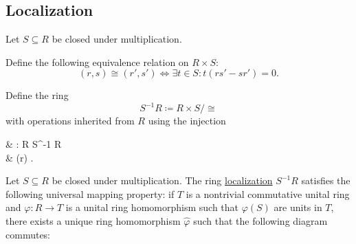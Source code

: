 \subsection{Localization}\label{subsec:localization}

\begin{definition}\label{def:ring_localization}
  Let \( S \subseteq R \) be closed under multiplication.

  Define the following equivalence relation on \( R \times S \):
  \begin{equation*}
    (r, s) \cong (r', s') \iff \exists t \in S: t(rs' - sr') = 0.
  \end{equation*}

  Define the ring
  \begin{equation*}
    S^{-1} R \coloneqq R \times S / \cong
  \end{equation*}
  with operations inherited from \( R \) using the injection
  \begin{balign*}
     & \iota: R \to S^{-1} R        \\
     & \iota(r) \coloneqq [(r, 1)].
  \end{balign*}
\end{definition}

\begin{proposition}\label{thm:ring_localization_universal_property}
  Let \( S \subseteq R \) be closed under multiplication. The ring \hyperref[def:ring_localization]{localization} \( S^{-1} R \) satisfies the following universal mapping property: if \( T \) is a nontrivial commutative unital ring and \( \varphi: R \to T \) is a unital ring homomorphism such that \( \varphi(S) \) are units in \( T \), there exists a unique ring homomorphism \( \hat \varphi \) such that the following diagram commutes:

  \begin{alignedeq}\label{thm:ring_localization_universal_property/diagram}
    \iffalse\begin{mplibcode}
      beginfig(1);
      input metapost/graphs;

      v1 := thelabel("$S^{-1} R$", origin);
      v2 := thelabel("$T$", (2, 0) scaled u);
      v3 := thelabel("$R$", (1, 1) scaled u);

      a1 := straight_arc(v3, v2);
      a2 := straight_arc(v3, v1);

      d1 := straight_arc(v1, v2);

      draw_vertices(v);
      draw_arcs(a);

      drawarrow d1 dotted;

      label.urt("$\varphi$", straight_arc_midpoint of a1);
      label.ulft("$\iota$", straight_arc_midpoint of a2);
      label.top("$\hat\varphi$", straight_arc_midpoint of d1);
      endfig;
    \end{mplibcode}\fi
  \end{alignedeq}
\end{proposition}

